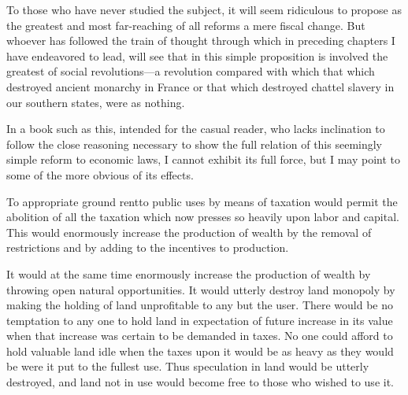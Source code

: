 \documentclass{book}
\begin{document}
To those who have never studied the subject, it will seem ridiculous to propose as the greatest and most far-reaching of all reforms a mere fiscal change. But whoever has followed the train of thought through which in preceding chapters I have endeavored to lead, will see that in this simple proposition is involved the greatest of social revolutions—a revolution compared with which that which destroyed ancient monarchy in France or that which destroyed chattel slavery in our southern states, were as nothing.

In a book such as this, intended for the casual reader, who lacks inclination to follow the close reasoning necessary to show the full relation of this seemingly simple reform to economic laws, I cannot exhibit its full force, but I may point to some of the more obvious of its effects.

To appropriate ground rent\footnotemark[1] to public uses by means of taxation would permit the abolition of all the taxation which now presses so heavily upon labor and capital. This would enormously increase the production of wealth by the removal of restrictions and by adding to the incentives to production.

It would at the same time enormously increase the production of wealth by throwing open natural opportunities. It would utterly destroy land monopoly by making the holding of land unprofitable to any but the user. There would be no temptation to any one to hold land in expectation of future increase in its value when that increase was certain to be demanded in taxes. No one could afford to hold valuable land idle when the taxes upon it would be as heavy as they would be were it put to the fullest use. Thus speculation in land would be utterly destroyed, and land not in use would become free to those who wished to use it.
\end{document}
